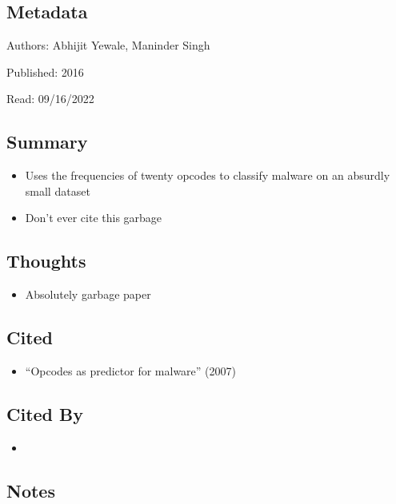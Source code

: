 \documentclass{article}
\begin{document}
\subsection*{Metadata}

\noindent Authors: Abhijit Yewale, Maninder Singh

\noindent Published: 2016

\noindent Read: 09/16/2022

\subsection*{Summary}
\begin{itemize}
	\item Uses the frequencies of twenty opcodes to classify malware on an absurdly small dataset
	\item Don't ever cite this garbage
\end{itemize}

\subsection*{Thoughts}
\begin{itemize}
	\item Absolutely garbage paper
\end{itemize}

\subsection*{Cited}
\begin{itemize}
	\item ``Opcodes as predictor for malware'' (2007)
\end{itemize}

\subsection*{Cited By}
\begin{itemize}
	\item
\end{itemize}

\subsection*{Notes}
\end{document}
